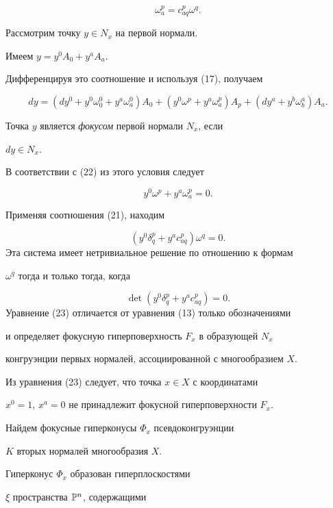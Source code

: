 \begin{equation}\label{eq:30}
\omega_a^p = c_{a q}^p \omega^q.
\end{equation}



 Рассмотрим точку $y \in N_x$ на первой нормали.


 Имеем $y = y^0 A_0 + y^a A_a$.


 Дифференцируя это соотношение и используя (17), получаем


\begin{equation}\label{eq:31}


 dy = (dy^0 + y^0 \omega_0^0 + y^a
\omega_a^0) A_0 + (y^0 \omega^p + y^a \omega_a^p) A_p + (dy^a +
y^b \omega_b^a) A_a.
\end{equation}

Точка $y$ является {\it фокусом} первой нормали $N_x$, если


$dy \in N_x$.


 В соответствии с (22) из этого условия следует


$$
y^0 \omega^p + y^a \omega_a^p = 0.
$$


Применяя соотношения (21), находим


$$


(y^0 \delta_q^p + y^a c_{a q}^p) \omega^q = 0.


$$
Эта система имеет нетривиальное решение по отношению к формам


$\omega^q$ тогда и только тогда, когда


\begin{equation}\label{eq:32}
\det (y^0 \delta_q^p + y^a c_{a q}^p) = 0.
\end{equation}
 Уравнение (23) отличается от уравнения (13) только обозначениями 


и определяет фокусную гиперповерхность $F_x$ в образующей $N_x$


конгруэнции первых нормалей, ассоциированной с многообразием $X$.


 Из уравнения (23) следует, что точка $x \in X$ с координатами


$x^0 = 1$, $x^a = 0$ не принадлежит фокусной гиперповерхности $F_x$.



Найдем фокусные гиперконусы $\Phi_x$ псевдоконгруэнции


$K$ вторых нормалей многообразия $X$.


 Гиперконус $\Phi_x$ образован гиперплоскостями


$\xi$ пространства $\Bbb{P}^n$, содержащими


